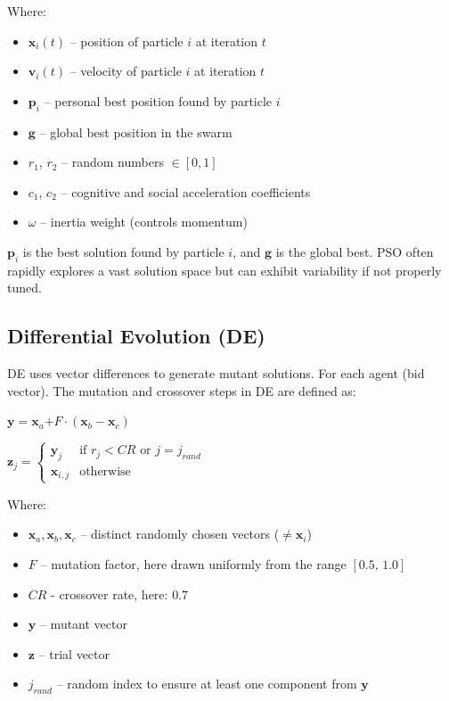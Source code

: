 \documentclass[sigconf]{acmart}
\begin{document}
	
	Where:
	\begin{itemize}
		\item $\mathbf{x}_i(t)$ – position of particle $i$ at iteration $t$
		\item $\mathbf{v}_i(t)$ – velocity of particle $i$ at iteration $t$
		\item $\mathbf{p}_i$ – personal best position found by particle $i$
		\item $\mathbf{g}$ – global best position in the swarm
		\item $r_1$, $r_2$ – random numbers $\in [0,1]$
		\item $c_1$, $c_2$ – cognitive and social acceleration coefficients
		\item $\omega$ – inertia weight (controls momentum)
	\end{itemize}
	
	
	$\mathbf{p}_i$ is the best solution found by particle $i$, and $\mathbf{g}$ is the global best. PSO often rapidly explores a vast solution space but can exhibit variability if not properly tuned.
	
	\subsection{Differential Evolution (DE)}
	DE uses vector differences to generate mutant solutions. For each agent (bid vector). The mutation and crossover steps in DE are defined as:
	
	$
	\mathbf{y} = \mathbf{x}_a \mathbf{+} F \cdot (\mathbf{x}_b - \mathbf{x}_c)
	$
	
	
	$\mathbf{z}_j =
	\begin{cases}
		\mathbf{y}_j & \text{if } r_j < CR \text{ or } j = j_{rand} \\
		\mathbf{x}_{i,j} & \text{otherwise}
	\end{cases}
	$
	
	Where:
	\begin{itemize}
		\item $\mathbf{x}_a, \mathbf{x}_b, \mathbf{x}_c$ – distinct randomly chosen vectors ($\ne \mathbf{x}_i$)
		\item $F$ – mutation factor, here drawn uniformly from the range $[0.5,\,1.0]$
		\item $CR$ - crossover rate, here: $0.7$
		\item $\mathbf{y}$ – mutant vector
		\item $\mathbf{z}$ – trial vector
		\item $j_{rand}$ – random index to ensure at least one component from $\mathbf{y}$
	\end{itemize}
	
\end{document}
